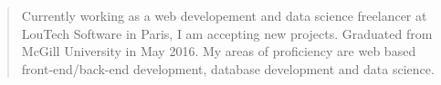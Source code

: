 \begin{quote}
Currently working as a web developement and data science freelancer at LouTech Software in Paris, I am accepting new projects. Graduated from McGill University in May 2016.
My areas of proficiency are web based front-end/back-end development, database development and data science.
\end{quote}





\divider\smallskip


\divider\smallskip


\divider\smallskip



\divider\smallskip







\begin{minipage}{0.20\textwidth}
\end{minipage}%
\begin{minipage}{0.22\textwidth}
\end{minipage}%
\begin{minipage}{0.15\textwidth}
\end{minipage}%








